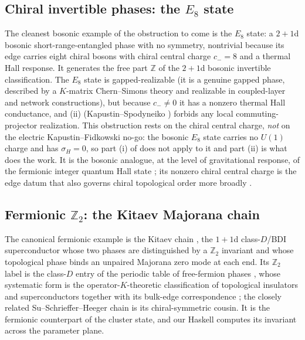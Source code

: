 \documentclass[12pt]{article}
\newcommand{\Ztwo}{\mathbb{Z}_2}
\newcommand{\Zint}{\mathbb{Z}}
\theoremstyle{definition}
\theoremstyle{remark}
\begin{document}
\subsection{Chiral invertible phases: the \texorpdfstring{$E_8$}{E8} state}

The cleanest bosonic example of the obstruction to come is the $E_8$ state: a $2+1$d bosonic
short-range-entangled phase with no symmetry, nontrivial because its edge carries eight
chiral bosons with chiral central charge $c_-=8$ and a thermal Hall response. It generates
the free part $\Zint$ of the $2+1$d bosonic invertible classification. The $E_8$ state is
gapped-realizable (it is a genuine gapped phase, described by a $K$-matrix Chern--Simons
theory and realizable in coupled-layer and network constructions), but because $c_-\ne0$ it
has a nonzero thermal Hall conductance, and (ii) (Kapustin--Spodyneiko
\cite{kapustin-spodyneiko-thermal}) forbids any local commuting-projector realization. This
obstruction rests on the chiral central charge, \emph{not} on the electric Kapustin--Fidkowski
no-go: the bosonic $E_8$ state carries no $U(1)$ charge and has $\sigma_H=0$, so part (i) of
 does not apply to it and part (ii) is what does the work. It is the bosonic
analogue, at the level of gravitational response, of the fermionic integer quantum Hall state
\cite{tknn-1982}; its nonzero chiral
central charge is the edge datum that also governs chiral topological order more broadly
\cite{kitaev-honeycomb}.

\subsection{Fermionic \texorpdfstring{$\Ztwo$}{Z2}: the Kitaev Majorana chain}

The canonical fermionic example is the Kitaev chain \cite{kitaev-majorana-wire}, the $1+1$d
class-$D$/BDI superconductor whose two phases are distinguished by a $\Ztwo$ invariant and
whose topological phase binds an unpaired Majorana zero mode at each end. Its $\Ztwo$ label is
the class-$D$ entry of the periodic table of free-fermion phases \cite{kitaev-periodic-table},
whose systematic form is the operator-$K$-theoretic classification of topological insulators
and superconductors \cite{thiang-ktheory,prodan-sb} together with its bulk-edge correspondence
\cite{bourne-kellendonk-rennie,kubota-controlled}; the closely related Su--Schrieffer--Heeger
chain \cite{ssh-1979} is its chiral-symmetric cousin. It is the fermionic counterpart of the
cluster state, and our Haskell computes its invariant across the parameter plane.
\end{document}
